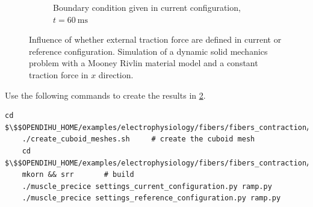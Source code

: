 \begin{figure}
\begin{subfigure}[t]{0.31\textwidth}
    \caption{Boundary condition given in current configuration, $t=\SI{60}{\milli\second}$}%
    \label{fig:current_configuration_3}%
  \end{subfigure}
  \caption{Influence of whether external traction force are defined in current or reference configuration. Simulation of a dynamic solid mechanics problem with a Mooney Rivlin material model and a constant traction force in $x$ direction.}%
  \label{fig:traction_current_reference_configuration}%
\end{figure}%

\begin{reproduce}
  Use the following commands to create the results in \cref{fig:traction_current_reference_configuration}.
  \begin{lstlisting}[columns=fullflexible,breaklines=true,postbreak=\mbox{\textcolor{gray}{$\hookrightarrow$}\space}]
    cd $\$$OPENDIHU_HOME/examples/electrophysiology/fibers/fibers_contraction/with_tendons_precice/meshes
    ./create_cuboid_meshes.sh     # create the cuboid mesh
    cd $\$$OPENDIHU_HOME/examples/electrophysiology/fibers/fibers_contraction/with_tendons_precice/traction_current_or_reference_configuration
    mkorn && srr       # build
    ./muscle_precice settings_current_configuration.py ramp.py
    ./muscle_precice settings_reference_configuration.py ramp.py
  \end{lstlisting}
\end{reproduce}



